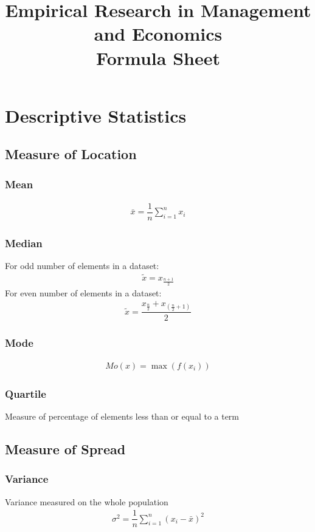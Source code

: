 \documentclass[openany,b5paper]{article}
\title{Empirical Research in Management and Economics\\Formula Sheet}
\begin{document}
\maketitle

\section{Descriptive Statistics}
\subsection{Measure of Location}
\subsubsection{Mean}
\begin{align}
\bar{x} = \dfrac{1}{n} \displaystyle\sum_{i=1}^{n} x_i
\end{align}
\subsubsection{Median}
For odd number of elements in a dataset:
\begin{align}
\tilde{x} = x_{\frac{n+1}{2}}
\end{align}
For even number of elements in a dataset:
\begin{align}
\tilde{x} = \dfrac{x_{\frac{n}{2}}+x_{\left(\frac{n}{2}+1\right)}}{2}
\end{align}
\subsubsection{Mode}
\begin{align}
Mo(x) = \max(f(x_i))
\end{align}

\subsubsection{Quartile}
Measure of percentage of elements less than or equal to a term

\subsection{Measure of Spread}
\subsubsection{Variance}
Variance measured on the whole population
\begin{align}
\sigma^2 = \dfrac{1}{n} \sum_{i=1}^{n} \left( x_i - \bar{x} \right)^2
\end{align}
\end{document}
